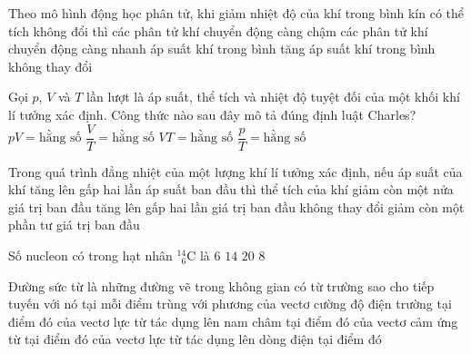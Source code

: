 	\begin{ex}%
		Theo mô hình động học phân tử, khi giảm nhiệt độ của khí trong bình kín có thể tích không đổi thì
		\choice
		{\True các phân tử khí chuyển động càng chậm}
		{các phân tử khí chuyển động càng nhanh}
		{áp suất khí trong bình tăng}
		{áp suất khí trong bình không thay đổi}
	\end{ex}

	\begin{ex}%
		Gọi $p$, $V$ và $T$ lần lượt là áp suất, thể tích và nhiệt độ tuyệt đối của một khối khí lí tưởng xác định. Công thức nào sau đây mô tả đúng định luật Charles?
		\choice
		{$pV=\text{hằng số}$}
		{\True $\dfrac{V}{T}=\text{hằng số}$}
		{$VT=\text{hằng số}$}
		{$\dfrac{p}{T}=\text{hằng số}$}
	\end{ex}

	\begin{ex}%
		Trong quá trình đẳng nhiệt của một lượng khí lí tưởng xác định, nếu áp suất của khí tăng lên gấp hai lần áp suất ban đầu thì thể tích của khí
		\choice
		{\True giảm còn một nửa giá trị ban đầu}
		{tăng lên gấp hai lần giá trị ban đầu}
		{không thay đổi}
		{giảm còn một phần tư giá trị ban đầu}
	\end{ex}

	\begin{ex}%
		Số nucleon có trong hạt nhân ${}^{14}_{\phantom{1}6}\text{C}$ là
		\choice
		{$6$}
		{\True $14$}
		{$20$}
		{$8$}
	\end{ex}

	\begin{ex}%
		Đường sức từ là những đường vẽ trong không gian có từ trường sao cho tiếp tuyến với nó tại mỗi điểm trùng với phương
		\choice
		{của vectơ cường độ điện trường tại điểm đó}
		{của vectơ lực từ tác dụng lên nam châm tại điểm đó}
		{\True của vectơ cảm ứng từ tại điểm đó}
		{của vectơ lực từ tác dụng lên dòng điện tại điểm đó}
	\end{ex}

